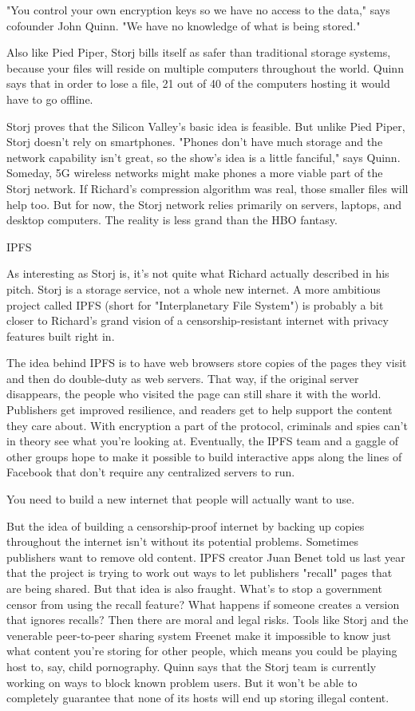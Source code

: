 \documentclass{tnreport}
\begin{document}
"You control your own encryption keys so we have no access to the data," says cofounder John Quinn. "We have no knowledge of what is being stored."

Also like Pied Piper, Storj bills itself as safer than traditional storage systems, because your files will reside on multiple computers throughout the world. Quinn says that in order to lose a file, 21 out of 40 of the computers hosting it would have to go offline.

Storj proves that the Silicon Valley's basic idea is feasible. But unlike Pied Piper, Storj doesn't rely on smartphones. "Phones don't have much storage and the network capability isn't great, so the show's idea is a little fanciful," says Quinn. Someday, 5G wireless networks might make phones a more viable part of the Storj network. If Richard's compression algorithm was real, those smaller files will help too. But for now, the Storj network relies primarily on servers, laptops, and desktop computers. The reality is less grand than the HBO fantasy.

IPFS

As interesting as Storj is, it's not quite what Richard actually described in his pitch. Storj is a storage service, not a whole new internet. A more ambitious project called IPFS (short for "Interplanetary File System") is probably a bit closer to Richard's grand vision of a censorship-resistant internet with privacy features built right in.

The idea behind IPFS is to have web browsers store copies of the pages they visit and then do double-duty as web servers. That way, if the original server disappears, the people who visited the page can still share it with the world. Publishers get improved resilience, and readers get to help support the content they care about. With encryption a part of the protocol, criminals and spies can't in theory see what you're looking at. Eventually, the IPFS team and a gaggle of other groups hope to make it possible to build interactive apps along the lines of Facebook that don't require any centralized servers to run.

You need to build a new internet that people will actually want to use.

But the idea of building a censorship-proof internet by backing up copies throughout the internet isn't without its potential problems. Sometimes publishers want to remove old content. IPFS creator Juan Benet told us last year that the project is trying to work out ways to let publishers "recall" pages that are being shared. But that idea is also fraught. What's to stop a government censor from using the recall feature? What happens if someone creates a version that ignores recalls?
Then there are moral and legal risks. Tools like Storj and the venerable peer-to-peer sharing system Freenet make it impossible to know just what content you're storing for other people, which means you could be playing host to, say, child pornography. Quinn says that the Storj team is currently working on ways to block known problem users. But it won't be able to completely guarantee that none of its hosts will end up storing illegal content.
\end{document}
